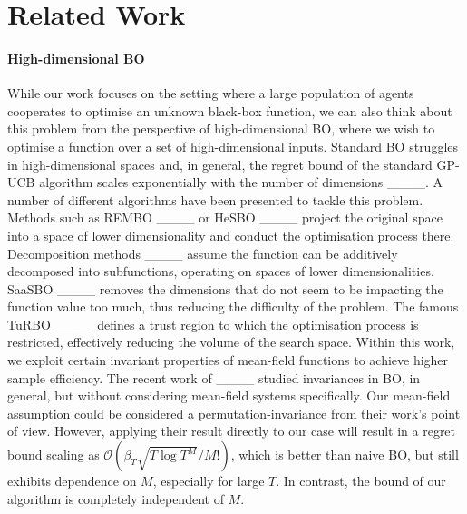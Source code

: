 \section{Related Work}
\paragraph{High-dimensional BO}
While our work focuses on the setting where a large population of agents cooperates to optimise an unknown black-box function, we can also think about this problem from the perspective of high-dimensional BO, where we wish to optimise a function over a set of high-dimensional inputs. Standard BO struggles in high-dimensional spaces and, in general, the regret bound of the standard GP-UCB algorithm scales exponentially with the number of dimensions ____. A number of different algorithms have been presented to tackle this problem. Methods such as REMBO ____ or HeSBO ____ project the original space into a space of lower dimensionality and conduct the optimisation process there. Decomposition methods ____ assume the function can be additively decomposed into subfunctions, operating on spaces of lower dimensionalities. SaaSBO ____ removes the dimensions that do not seem to be impacting the function value too much, thus reducing the difficulty of the problem. The famous TuRBO ____ defines a trust region to which the optimisation process is restricted, effectively reducing the volume of the search space. Within this work, we exploit certain invariant properties of mean-field functions to achieve higher sample efficiency. The recent work of ____ studied invariances in BO, in general, but without considering mean-field systems specifically. Our mean-field assumption could be considered a permutation-invariance from their work's point of view. However, applying their result directly to our case will result in a regret bound scaling as $\mathcal{O}(\beta_T\sqrt{T\log T^M} / M!)$, which is better than naive BO, but still exhibits dependence on $M$, especially for large $T$. In contrast, the bound of our algorithm is completely independent of $M$. 

